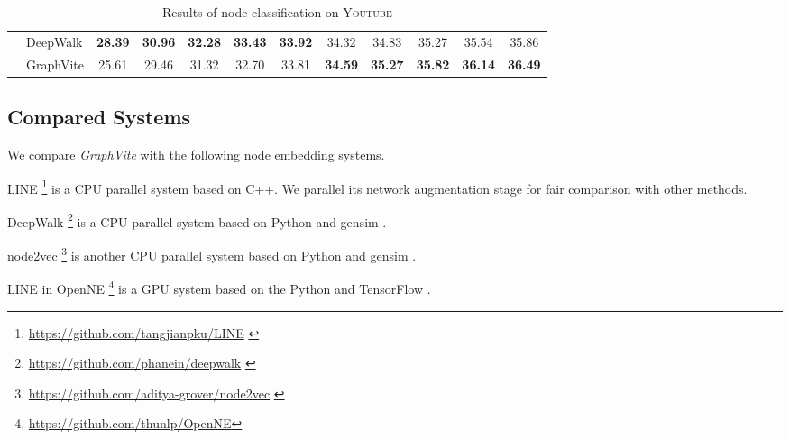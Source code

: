 \documentclass[sigconf]{acmart}
\newcommand{\dataset}[1]{\textsc{#1}\xspace}
\newcommand{\best}[1]{\textbf{#1}}
\newcommand{\Graphy}{\textit{GraphVite}\xspace}
\begin{document}
\begin{table*}
\begin{tabular}{llcccccccccc}
                                        & DeepWalk\cite{tang2015line}           & \best{28.39}  & \best{30.96}  & \best{32.28}  & \best{33.43}  & \best{33.92}
                                                                                & 34.32         & 34.83         & 35.27         & 35.54         & 35.86         \\
\cmidrule{2-12}
                                        & GraphVite                             & 25.61         & 29.46         & 31.32         & 32.70         & 33.81
                                                                                & \best{34.59}  & \best{35.27}  & \best{35.82}  & \best{36.14}  & \best{36.49} \\ \bottomrule
    \end{tabular}
    \caption{Results of node classification on \dataset{Youtube}}
    \label{tab:performance_youtube}
\end{table*}

\subsection{Compared Systems}

We compare \Graphy with the following node embedding systems.

\begin{itemize}[leftmargin=10pt]
    \begin{item}
        LINE \cite{tang2015line} \footnote{\url{https://github.com/tangjianpku/LINE} \label{fn:line_url}} is a CPU parallel system based on C++. We parallel its network augmentation stage for fair comparison with other methods.
    \end{item}
    \begin{item}
        DeepWalk \cite{perozzi2014deepwalk} \footnote{\url{https://github.com/phanein/deepwalk} \label{fn:deepwalk_url}} is a CPU parallel system based on Python and gensim \cite{rehurek2010software}.
    \end{item}
    \begin{item}
        node2vec \cite{grover2016node2vec} \footnote{\url{https://github.com/aditya-grover/node2vec} \label{fn:node2vec_url}} is another CPU parallel system based on Python and gensim \cite{rehurek2010software}.
    \end{item}
    \begin{item}
        LINE in OpenNE \cite{thunlp2017openne} \footnote{\url{https://github.com/thunlp/OpenNE}} is a GPU system based on the Python and TensorFlow \cite{abadi2016tensorflow}.
    \end{item}
\end{itemize}
\end{document}
